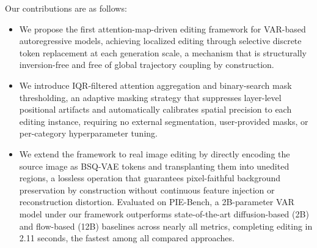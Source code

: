 Our contributions are as follows:

\begin{itemize}
    \item We propose the first attention-map-driven editing framework for VAR-based autoregressive models, achieving localized editing through selective discrete token replacement at each generation scale, a mechanism that is structurally inversion-free and free of global trajectory coupling by construction.

    \item We introduce IQR-filtered attention aggregation and binary-search mask thresholding, an adaptive masking strategy that suppresses layer-level positional artifacts and automatically calibrates spatial precision to each editing instance, requiring no external segmentation, user-provided masks, or per-category hyperparameter tuning.

    \item We extend the framework to real image editing by directly encoding the source image as BSQ-VAE tokens and transplanting them into unedited regions, a lossless operation that guarantees pixel-faithful background preservation by construction without continuous feature injection or reconstruction distortion. Evaluated on PIE-Bench, a 2B-parameter VAR model under our framework outperforms state-of-the-art diffusion-based (2B) and flow-based (12B) baselines across nearly all metrics, completing editing in 2.11 seconds, the fastest among all compared approaches.
\end{itemize}
